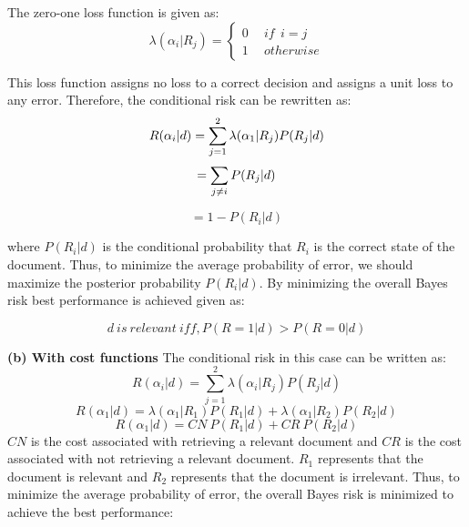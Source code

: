\documentclass[10pt,onecolumn,letterpaper]{article}
\begin{document}
The zero-one loss function is given as:
\begin{equation}
\lambda(\alpha_i|R_j) =\left\{ \begin{array}{cc}
                        0  & \ \ if \ \  i=j \\
                        1   & \ \ otherwise
                        \end{array} \right.
\end{equation}

\noindent This loss function assigns no loss to a correct decision and assigns a unit loss to any error. Therefore, the conditional risk can be rewritten as:
%
%
\begin{equation}
 R(\alpha_i|d)=  \sum_{j=1}^2 \lambda(\alpha_1|R_j)P(R_j|d)\\
                 \end{equation}
\begin{equation} = \sum_{j\neq i} P(R_j|d)\\
\end{equation}

\begin{equation} = 1-P(R_i|d) \end{equation}


\noindent where $P(R_i|d)$ is the conditional probability that $R_i$ is the correct state of the document. Thus, to minimize the average probability of error, we should maximize the posterior probability $P(R_i|d)$. By minimizing the overall Bayes risk best performance is achieved given as:

\begin{equation}
d ~is ~relevant ~iff, P(R=1|d) > P(R=0|d)
\end{equation}

\vspace{12pt}
\noindent\textbf{(b) With cost functions}
The conditional risk in this case can be written as:
\begin{equation}R(\alpha_i|d)=\sum_{j=1}^2\lambda(\alpha_i|R_j)P(R_j|d) \end{equation}
\begin{equation}R(\alpha_1|d)=\lambda(\alpha_1|R_1)P(R_1|d)+ \lambda(\alpha_1|R_2)P(R_2|d) \end{equation}
\begin{equation}R(\alpha_1|d)=CN ~P(R_1|d)+ CR ~P(R_2|d) \end{equation}
\noindent $CN$ is the cost associated with retrieving a relevant document and $CR$ is the cost associated with not retrieving a relevant document. $R_1$ represents that the document is relevant and $R_2$ represents that the document is irrelevant.  Thus, to minimize the average probability of error, the overall Bayes risk is minimized to achieve the best performance:
\end{document}

